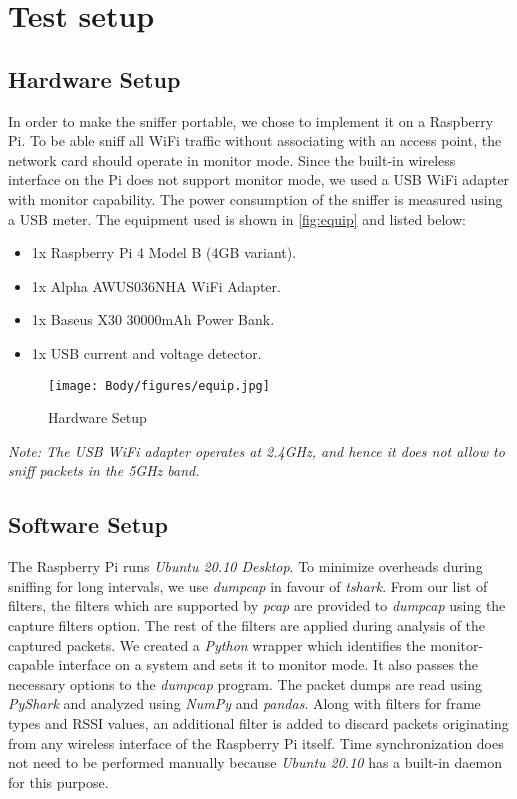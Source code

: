 \section{Test setup}

\subsection{Hardware Setup}
In order to make the sniffer portable, we chose to implement it on a Raspberry Pi. To be able sniff all WiFi traffic without associating with an access point, the network card should operate in monitor mode. \cite{said_using_nodate} Since the built-in wireless interface on the Pi does not support monitor mode, we used a USB WiFi adapter with monitor capability. The power consumption of the sniffer is measured using a USB meter. The equipment used is shown in \autoref{fig:equip} and listed below:
\begin{itemize}
    \item 1x Raspberry Pi 4 Model B (4GB variant).
    \item 1x Alpha AWUS036NHA WiFi Adapter.
    \item 1x Baseus X30 30000mAh Power Bank.
    \item 1x USB current and voltage detector.
\end{itemize}

\begin{figure}[h!]
    \centering
    \texttt{[image: Body/figures/equip.jpg]}
    \caption{Hardware Setup}
    \label{fig:equip}
\end{figure}

\textit{Note: The USB WiFi adapter operates at 2.4GHz, and hence it does not allow to sniff packets in the 5GHz band.}

\subsection{Software Setup}
The Raspberry Pi runs \textit{Ubuntu 20.10 Desktop}. To minimize overheads during sniffing for long intervals, we use \textit{dumpcap} in favour of \textit{tshark}. From our list of filters, the filters which are supported by \textit{pcap} are provided to \textit{dumpcap} using the capture filters option. The rest of the filters are applied during analysis of the captured packets. We created a \textit{Python} wrapper which identifies the monitor-capable interface on a system and sets it to monitor mode. It also passes the necessary options to the \textit{dumpcap} program. The packet dumps are read using \textit{PyShark} and analyzed using \textit{NumPy} and \textit{pandas}. Along with filters for frame types and RSSI values, an additional filter is added to discard packets originating from any wireless interface of the Raspberry Pi itself. Time synchronization does not need to be performed manually because \textit{Ubuntu 20.10} has a built-in daemon for this purpose.
 
